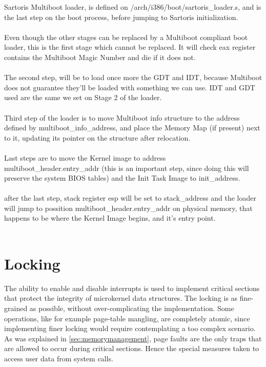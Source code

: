 \documentclass[11pt, letterpaper, twoside, english]{book}
\begin{document}
Sartoris Multiboot loader, is defined on \textsf{/arch/i386/boot/sartoris\_loader.s}, and is the last step on the boot process, before jumping to Sartoris initialization.\\
\\
Even though the other stages can be replaced by a Multiboot compliant boot loader, this is the first stage which cannot be replaced. It will check eax register contains the Multiboot Magic Number and die if it does not.\\
\\
The second step, will be to load once more the GDT and IDT, because Multiboot does not guarantee they'll be loaded with something we can use. IDT and GDT used are the same we set on Stage 2 of the loader.\\
\\
Third step of the loader is to move Multiboot info structure to the address defined by \textsf{multiboot\_info\_address}, and place the Memory Map (if present) next to it, updating its pointer on the structure after relocation.\\
\\
Last steps are to move the Kernel image to address \textsf{multiboot\_header.entry\_addr} (this is an important step, since doing this will preserve the system BIOS tables) and the Init Task Image to \textsf{init\_address}.\\
\\
after the last step, stack register esp will be set to \textsf{stack\_address} and the loader will jump to possition \textsf{multiboot\_header.entry\_addr} on physical memory, that happens to be where the Kernel Image begins, and it's entry point.\\
\\
\section{Locking}

The ability to enable and disable interrupts is used to implement critical sections that protect the integrity of microkernel data structures. The locking is as fine-grained as possible, without over-complicating the implementation. Some operations, like for example page-table mangling, are completely atomic, since implementing finer locking would require contemplating a too complex scenario. As was explained in \ref{sec:memorymanagement}, page faults are the only traps that are allowed to occur during critical sections. Hence the special measures taken to access user data from system calls.
\end{document}
